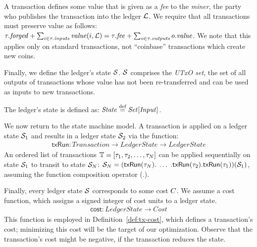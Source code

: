 A transaction defines some value that is given as a \emph{fee} to the
\emph{miner}, \ie the party who publishes the transaction into the ledger
$\mathcal{L}$. We require that all transactions must preserve value as
follows:
$\tau.\mathit{forged} + \sum_{i \in \tau.\mathit{inputs}}^{} \mathit{value}(i, \mathcal{L}) = \tau.\mathit{fee} + \sum_{o \in \tau.\mathit{outputs}}^{} o.\mathit{value}$.
We note that this applies only on standard transactions, not ``coinbase''
transactions which create new coins.

Finally, we define the ledger's state $\mathcal{S}$. $\mathcal{S}$ comprises
the \emph{UTxO set}, \ie the set of all outputs of transactions whose value
has not been re-transferred and can be used as inputs to new transactions.

\begin{definition}\label{def:lstate}
    The ledger's state is defined as: $\mathit{State} \stackrel{\textrm{\scriptsize def}}{=} \mathit{Set}[\mathit{Input}]$.
\end{definition}

We now return to the state machine model. A transaction is applied on a ledger
state $\mathcal{S}_1$ and results in a ledger state $\mathcal{S}_2$ via the
function:
\begin{align*}
    \mathsf{txRun}: \mathit{Transaction} \rightarrow \mathit{LedgerState} \rightarrow \mathit{LedgerState}
\end{align*}
An ordered list of transactions $\mathbb{T} = [\tau_1, \tau_2, \dots, \tau_N]$ can be
applied sequentially on state $\mathcal{S}_1$ to transit to state
$\mathcal{S}_N$: $\mathcal{S}_N = (\mathsf{txRun}(\tau_N).\; \dots\;
.\mathsf{txRun}(\tau_2) .  \mathsf{txRun}(\tau_1))(\mathcal{S}_1)$, assuming the
function composition operator (.).

Finally, every ledger state $\mathcal{S}$ corresponds to some cost
$C$.  We assume a cost function, which assigns a signed integer of
cost units to a ledger state.
\begin{align*}
    \mathsf{cost}: \mathit{LedgerState} \rightarrow \mathit{Cost}
\end{align*}
This function is employed in
Definition~\ref{def:tx-cost}, which defines a transaction's cost; minimizing
this cost will be the target of our optimization. Observe that the
transaction's cost might be negative, \eg if the transaction reduces the state.

